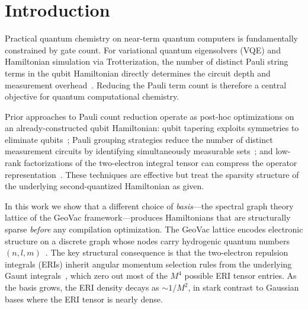 \documentclass[aps,pra,twocolumn,superscriptaddress,longbibliography]{revtex4-2}
\begin{document}
\maketitle

\section{Introduction}
\label{sec:intro}

Practical quantum chemistry on near-term quantum computers is fundamentally
constrained by gate count.  For variational quantum eigensolvers (VQE) and
Hamiltonian simulation via Trotterization, the number of distinct Pauli
string terms in the qubit Hamiltonian directly determines the circuit depth
and measurement overhead~\cite{mcardle2020,cao2019}.  Reducing the Pauli
term count is therefore a central objective for quantum computational
chemistry.

Prior approaches to Pauli count reduction operate as post-hoc optimizations
on an already-constructed qubit Hamiltonian: qubit tapering exploits
symmetries to eliminate qubits~\cite{bravyi2017}; Pauli grouping strategies
reduce the number of distinct measurement circuits by identifying
simultaneously measurable sets~\cite{verteletskyi2020,yen2020}; and
low-rank factorizations of the two-electron integral tensor can compress
the operator representation~\cite{motta2021,lee2021}.  These techniques
are effective but treat the sparsity structure of the underlying
second-quantized Hamiltonian as given.

In this work we show that a different choice of \emph{basis}---the
spectral graph theory lattice of the GeoVac framework---produces
Hamiltonians that are structurally sparse \emph{before} any compilation
optimization.  The GeoVac lattice encodes electronic structure on a
discrete graph whose nodes carry hydrogenic quantum numbers
$(n, l, m)$~\cite{loutey_paper7,loutey_paper13}.  The key structural
consequence is that the two-electron repulsion integrals (ERIs) inherit
angular momentum selection rules from the underlying Gaunt
integrals~\cite{gaunt1929}, which zero out most of the $M^4$ possible
ERI tensor entries.  As the basis grows, the ERI density decays as
$\sim 1/M^2$, in stark contrast to Gaussian bases where the ERI tensor
is nearly dense.
\end{document}
